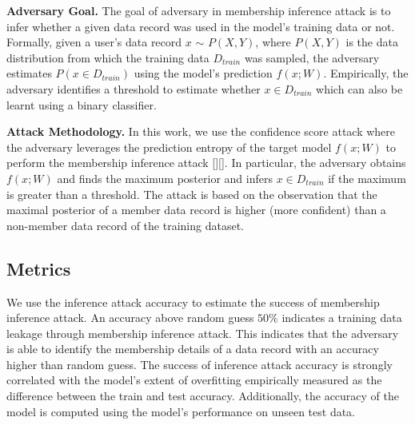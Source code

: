 \noindent\textbf{Adversary Goal.} The goal of adversary in membership inference attack is to infer whether a given data record was used in the model's training data or not.
Formally, given a user's data record $x$ $\sim$ $P(X,Y)$, where $P(X,Y)$ is the data distribution from which the training data $D_{train}$ was sampled, the adversary estimates $P(x \in D_{train})$ using the model's prediction $f(x;W)$.
Empirically, the adversary identifies a threshold to estimate whether $x \in D_{train}$ which can also be learnt using a binary classifier.

\noindent\textbf{Attack Methodology.} In this work, we use the confidence score attack where the adversary leverages the prediction entropy of the target model $f(x;W)$ to perform the membership inference attack [][].
In particular, the adversary obtains $f(x;W)$ and finds the maximum posterior and infers $x \in D_{train}$ if the maximum is greater than a threshold.
The attack is based on the observation that the maximal posterior of a member data record is higher (more confident) than a non-member data record of the training dataset.



\subsection{Metrics}

We use the inference attack accuracy to estimate the success of membership inference attack.
An accuracy above random guess $50\%$ indicates a training data leakage through membership inference attack.
This indicates that the adversary is able to identify the membership details of a data record with an accuracy higher than random guess.
The success of inference attack accuracy is strongly correlated with the model's extent of overfitting empirically measured as the difference between the train and test accuracy.
Additionally, the accuracy of the model is computed using the model's performance on unseen test data.